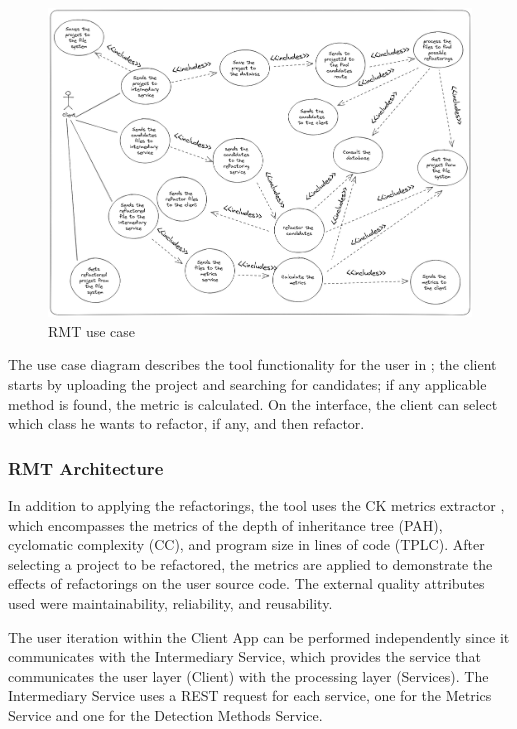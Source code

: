 \begin{figure}[ht!]
\SetCaptionWidth{\textwidth}
\caption{RMT use case}
\label{fig-usecase}
\includegraphics[width =\textwidth]{Chapter-2/Figures/usecase.png}
\end{figure}

The use case diagram describes the tool functionality for the user in ; the client starts by uploading the project and searching for candidates; if any applicable method is found, the metric is calculated. On the interface, the client can select which class he wants to refactor, if any, and then refactor.


\subsubsection{RMT Architecture}
\label{sub-architecture}

 In addition to applying the refactorings, the tool uses the CK metrics extractor \cite{ck}, which encompasses the metrics of the depth of inheritance tree (PAH), cyclomatic complexity (CC), and program size in lines of code (TPLC). After selecting a project to be refactored, the metrics are applied to demonstrate the effects of refactorings on the user source code. The external quality attributes used were maintainability, reliability, and reusability.

The user iteration within the Client App can be performed independently since it communicates with the Intermediary Service, which provides the service that communicates the user layer (Client) with the processing layer (Services). The Intermediary Service uses a REST request for each service, one for the Metrics Service and one for the Detection Methods Service.


